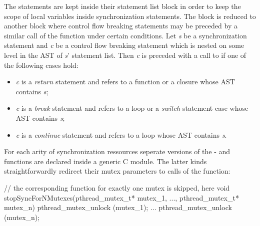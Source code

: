 The statements are kept inside their statement list block in order to keep the scope of local variables inside synchronization statements. The block is reduced to another block where control flow breaking statements may be preceded by a similar call of the  function under certain conditions. Let \textit{s} be a synchronization statement and \textit{c} be a control flow breaking statement which is nested on some level in the AST of \textit{s}' statement list. Then \textit{c} is preceded with a call to  if one of the following cases hold:
\begin{itemize}
\item \textit{c} is a \textit{return} statement and refers to a function or a closure whose AST contains \textit{s};
\item \textit{c} is a \textit{break} statement and refers to a loop or a \textit{switch} statement case whose AST contains \textit{s};
\item \textit{c} is a \textit{continue} statement and refers to a loop whose AST contains \textit{s}.
\end{itemize}

For each arity of synchronization ressources seperate versions of the - and  functions are declared inside a generic C module. The latter kinds straightforwardly redirect their mutex parameters to calls of the  function:
\begin{ccode}
// the corresponding function for exactly one mutex is skipped, here
void stopSyncForNMutexes(pthread_mutex_t* mutex_1, ..., pthread_mutex_t* mutex_n) { 
  pthread_mutex_unlock (mutex_1);
  ...
  pthread_mutex_unlock (mutex_n); 
}
\end{ccode}

